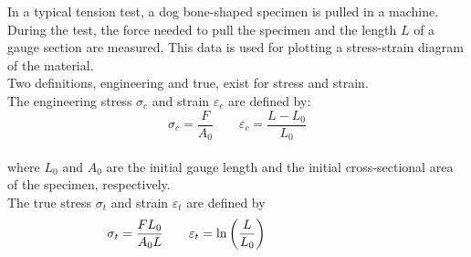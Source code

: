 \documentclass[a4paper, 12pt]{report}
\def\ni{blue!20!white}
\begin{document}
    \newpage
    \begin{tcolorbox}[title={\color{black}{\section{Q8}}}, colback=white, colframe=\ni, boxrule=1mm, width=1\textwidth]    
    In a typical tension test, a dog bone-shaped specimen is pulled in a machine. During the test, the force needed to pull the specimen and the length \( L \) of a gauge section are measured. This data is used for plotting a stress-strain diagram of the material.\\[8pt]
    Two definitions, engineering and true, exist for stress and strain.\\
    The engineering stress \( \sigma_c \) and strain \( \varepsilon_c \) are defined by:\\[0em]
    \[\sigma_c = \frac{F}{A_0} \qquad \varepsilon_c = \frac{L - L_0}{L_0}\]\\[0em]
    where \( L_0 \) and \( A_0 \) are the initial gauge length and the initial cross-sectional area of the specimen, respectively.\\[8pt]
    The true stress \( \sigma_t \) and strain \( \varepsilon_t \) are defined by\\[1em]
    \[\hspace{-8em} \sigma_t = \frac{F L_0}{A_0 L} \qquad \varepsilon_t = \ln\left(\frac{L}{L_0}\right)\]\\
    

\end{tcolorbox}
\end{document}

